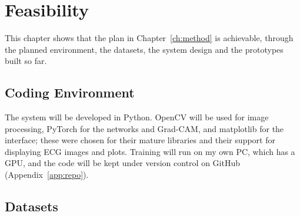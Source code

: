 \chapter{Feasibility}
\label{ch:feasibility}

This chapter shows that the plan in Chapter~\ref{ch:method} is achievable, through the planned environment, the datasets, the system design and the prototypes built so far.

\section{Coding Environment}
\label{sec:env}

The system will be developed in Python. OpenCV \cite{bradski_opencv_2000} will be used for image processing, PyTorch for the networks and Grad-CAM, and matplotlib for the interface; these were chosen for their mature libraries and their support for displaying ECG images and plots. Training will run on my own PC, which has a GPU, and the code will be kept under version control on GitHub (Appendix~\ref{app:repo}).

\section{Datasets}
\label{sec:datasets}

